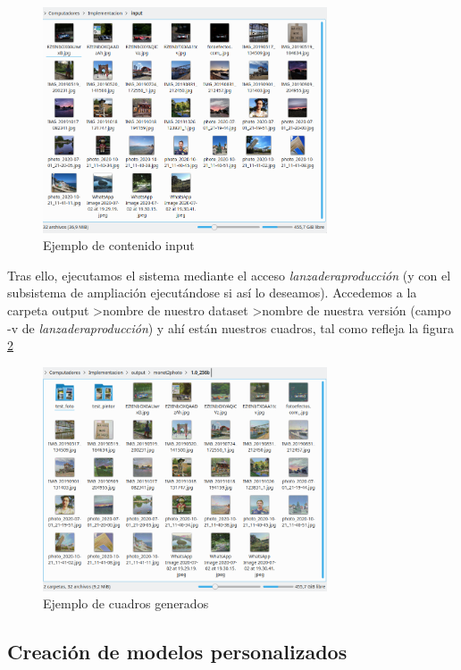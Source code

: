 \documentclass[../main.tex]{subfiles}
\begin{document}
\begin{figure}[h!]
    \centering
    \includegraphics[width=0.75\textwidth]{imagenes/muestra_input.png}
    \caption{Ejemplo de contenido input}
    \label{fig:muestra_input}
\end{figure}

Tras ello, ejecutamos el sistema mediante el acceso \textit{lanzadera\textunderscore producción} (y con el subsistema de ampliación ejecutándose si así lo deseamos). Accedemos a la carpeta output \textgreater nombre de nuestro dataset \textgreater nombre de nuestra versión (campo -v de \textit{lanzadera\textunderscore producción}) y ahí están nuestros cuadros, tal como refleja la figura \ref{fig:muestra_output}

\begin{figure}[h!]
    \centering
    \includegraphics[width=0.75\textwidth]{imagenes/muestra_output.png}
    \caption{Ejemplo de cuadros generados}
    \label{fig:muestra_output}
\end{figure}

\subsection{Creación de modelos personalizados}
\end{document}
